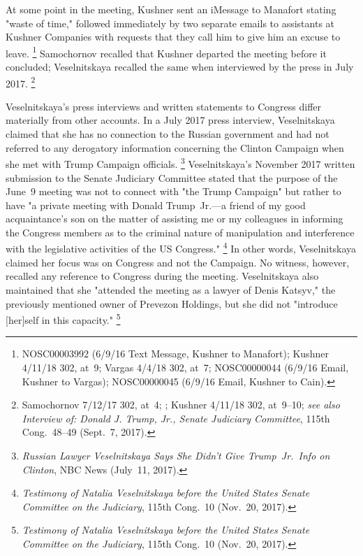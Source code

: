 At some point in the meeting, Kushner sent an iMessage to Manafort stating "waste of time," followed immediately by two separate emails to assistants at Kushner Companies with requests that they call him to give him an excuse to leave.%
\footnote{NOSC00003992 (6/9/16 Text Message, Kushner to Manafort);
Kushner 4/11/18 302, at~9;
Vargas 4/4/18 302, at~7;
NOSC00000044 (6/9/16 Email, Kushner to Vargas);
NOSC00000045 (6/9/16 Email, Kushner to Cain).}
Samochornov recalled that Kushner departed the meeting before it concluded; Veselnitskaya recalled the same when interviewed by the press in July 2017.%
\footnote{Samochornov 7/12/17 302, at~4;
;
Kushner 4/11/18 302, at~9--10;
\textit{see also Interview of: Donald J. Trump, Jr., Senate Judiciary Committee}, 115th Cong.~48--49 (Sept.~7, 2017).}

Veselnitskaya's press interviews and written statements to Congress differ materially from other accounts.
In a July 2017 press interview, Veselnitskaya claimed that she has no connection to the Russian government and had not referred to any derogatory information concerning the Clinton Campaign when she met with Trump Campaign officials.%
\footnote{\textit{Russian Lawyer Veselnitskaya Says She Didn't Give Trump~Jr.\ Info on Clinton}, NBC News (July~11, 2017).}
Veselnitskaya's November 2017 written submission to the Senate Judiciary Committee stated that the purpose of the June~9 meeting was not to connect with "the Trump Campaign" but rather to have "a private meeting with Donald Trump~Jr.---a friend of my good acquaintance's son on the matter of assisting me or my colleagues in informing the Congress members as to the criminal nature of manipulation and interference with the legislative activities of the US Congress."%
\footnote{\textit{Testimony of Natalia Veselnitskaya before the United States Senate Committee on the Judiciary}, 115th Cong.~10 (Nov.~20, 2017).}
In other words, Veselnitskaya claimed her focus was on Congress and not the Campaign.
No witness, however, recalled any reference to Congress during the meeting.
Veselnitskaya also maintained that she "attended the meeting as a lawyer of Denis Katsyv," the previously mentioned owner of Prevezon Holdings, but she did not "introduce [her]self in this capacity."%
\footnote{\textit{Testimony of Natalia Veselnitskaya before the United States Senate Committee on the Judiciary}, 115th Cong.~10 (Nov.~20, 2017).}

